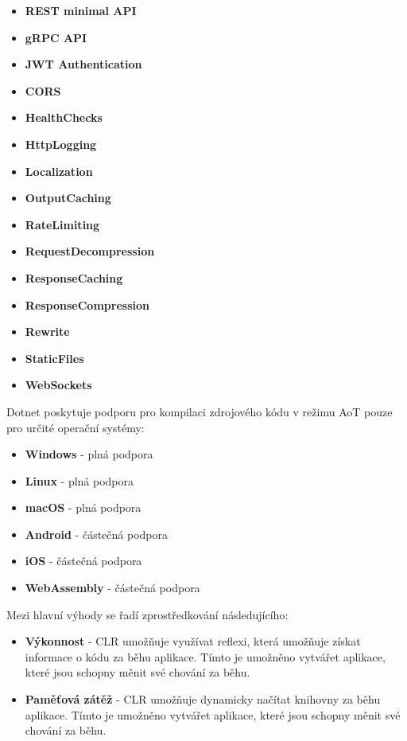 \begin{itemize}
    \item \textbf{REST minimal API}
    \item \textbf{gRPC API}
    \item \textbf{JWT Authentication}
    \item \textbf{CORS}
    \item \textbf{HealthChecks}
    \item \textbf{HttpLogging}
    \item \textbf{Localization}
    \item \textbf{OutputCaching}
    \item \textbf{RateLimiting}
    \item \textbf{RequestDecompression}
    \item \textbf{ResponseCaching}
    \item \textbf{ResponseCompression}
    \item \textbf{Rewrite}
    \item \textbf{StaticFiles}
    \item \textbf{WebSockets}
\end{itemize}


Dotnet poskytuje podporu pro kompilaci zdrojového kódu v režimu AoT pouze pro určité operační systémy:

\begin{itemize}
    \item \textbf{Windows} - plná podpora
    \item \textbf{Linux} - plná podpora
    \item \textbf{macOS} - plná podpora
    \item \textbf{Android} - částečná podpora
    \item \textbf{iOS} - částečná podpora
    \item \textbf{WebAssembly} - částečná podpora
\end{itemize}


Mezi hlavní výhody se řadí zprostředkování následujícího:
\begin{itemize}
    \item  \textbf{Výkonnost} - CLR umožňuje využívat reflexi, která umožňuje získat informace o kódu za běhu aplikace. Tímto je umožněno vytvářet aplikace, které jsou schopny měnit své chování za běhu.
    \item \textbf{Paměťová zátěž} - CLR umožňuje dynamicky načítat knihovny za běhu aplikace. Tímto je umožněno vytvářet aplikace, které jsou schopny měnit své chování za běhu.
\end{itemize}


